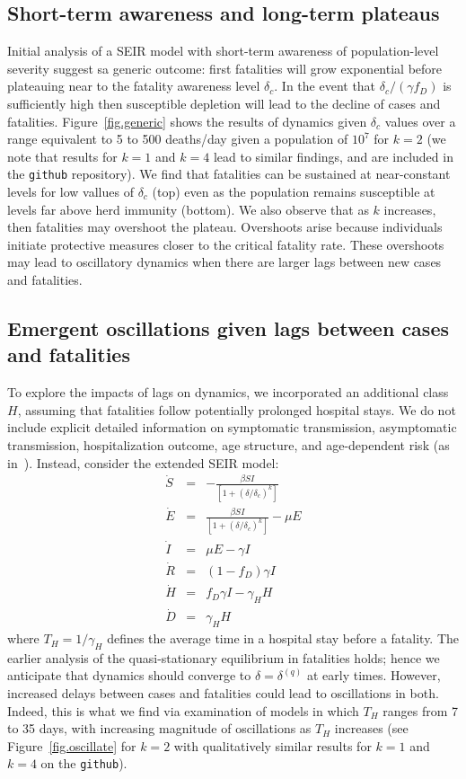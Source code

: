 \subsection{Short-term awareness and long-term plateaus}
Initial analysis of a SEIR model with short-term 
awareness of population-level severity suggest sa generic outcome: first fatalities will grow
exponential before plateauing near to the fatality awareness level $\delta_c$.
In the event that $\delta_c/(\gamma f_D)$ is sufficiently high then susceptible
depletion will lead to the decline of cases and fatalities.
Figure~\ref{fig.generic} shows
the results of dynamics given $\delta_c$ values over a range 
equivalent to 5 to 500 deaths/day given a population of $10^7$
for $k=2$ (we note that results for $k=1$ and $k=4$ lead to similar
findings, and are included in the \verb|github| repository).
We find that fatalities can be sustained at near-constant levels
for low vallues of $\delta_c$ (top)
even as the population remains susceptible at levels far above herd immunity (bottom).
We also observe that as $k$ increases, then fatalities may overshoot
the plateau. Overshoots arise because individuals initiate protective measures
closer to the critical fatality rate.
These overshoots may lead to oscillatory dynamics
when there are larger lags between new cases and fatalities.

\subsection{Emergent oscillations given lags between cases and fatalities}
To explore the impacts of lags on dynamics,
we incorporated an additional class $H$,
assuming that fatalities follow potentially prolonged
hospital stays.  We do not include explicit
detailed information on symptomatic transmission, asymptomatic
transmission, hospitalization outcome,
age structure, and age-dependent risk (as in~\citep{ferguson2020report}). 
Instead, consider the extended SEIR model:
\begin{eqnarray}
\dot{S} &=& -\frac{\beta SI}{\left[1+\left(\delta/\delta_c\right)^{k}\right]}\\
\dot{E} &=& \frac{\beta SI}{\left[1+\left(\delta/\delta_c\right)^{k}\right]}-\mu E\\
\dot{I} &=& \mu E-\gamma I \\
\dot{R} &=& (1-f_D)\gamma I\\
\dot{H} &=& f_D\gamma I - \gamma_H H\\
\dot{D} &=& \gamma_H H
\end{eqnarray}
where $T_H=1/\gamma_H$ defines the average time in a hospital
stay before a fatality. The earlier analysis of
the quasi-stationary equilibrium in fatalities holds; hence
we anticipate that dynamics should converge to $\delta=\delta^{(q)}$
at early times. However, increased delays between cases and
fatalities could lead to oscillations in both.  Indeed, this
is what we find via examination of models in which
$T_H$ ranges from 7 to 35 days, with increasing magnitude of
oscillations as $T_H$ increases (see Figure~\ref{fig.oscillate} 
for $k=2$ with qualitatively similar results for $k=1$ and
$k=4$ on the \verb|github|).

